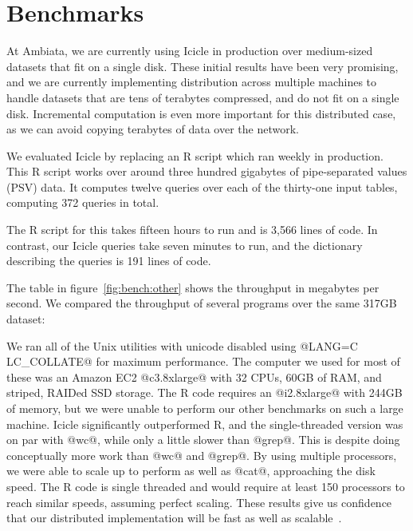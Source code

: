 \section{Benchmarks}
\label{s:Benchmarks}


At Ambiata, we are currently using Icicle in production over medium-sized datasets that fit on a single disk.
These initial results have been very promising, and we are currently implementing distribution across multiple machines to handle datasets that are tens of terabytes compressed, and do not fit on a single disk.
Incremental computation is even more important for this distributed case, as we can avoid copying terabytes of data over the network.

We evaluated Icicle by replacing an R script which ran weekly in production.
This R script works over around three hundred gigabytes of pipe-separated values (PSV) data.
It computes twelve queries over each of the thirty-one input tables, computing 372 queries in total.

The R script for this takes fifteen hours to run and is 3,566 lines of code.
In contrast, our Icicle queries take seven minutes to run, and the dictionary describing the queries is 191 lines of code.

The table in figure~\ref{fig:bench:other} shows the throughput in megabytes per second.
We compared the throughput of several programs over the same 317GB dataset:

We ran all of the Unix utilities with unicode disabled using @LANG=C LC_COLLATE@ for maximum performance.
The computer we used for most of these was an Amazon EC2 @c3.8xlarge@ with 32 CPUs, 60GB of RAM, and striped, RAIDed SSD storage.
The R code requires an @i2.8xlarge@ with 244GB of memory, but we were unable to perform our other benchmarks on such a large machine.
Icicle significantly outperformed R, and the single-threaded version was on par with @wc@, while only a little slower than @grep@.
This is despite doing conceptually more work than @wc@ and @grep@.
By using multiple processors, we were able to scale up to perform as well as @cat@, approaching the disk speed.
The R code is single threaded and would require at least 150 processors to reach similar speeds, assuming perfect scaling.
These results give us confidence that our distributed implementation will be fast as well as scalable~\cite{mcsherry2015scalability}.

